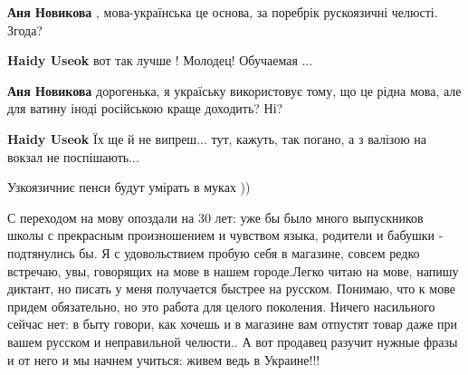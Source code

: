 \begin{itemize}
\begin{itemize}
\textbf{Аня Новикова} , мова-українська це основа, за поребрік рускоязичні челюсті. Згода?

 
\textbf{Haidy Useok} вот так лучше ! Молодец! Обучаемая ...

 
\textbf{Аня Новикова} дорогенька, я україську
використовує тому, що це рідна мова, але для ватину іноді російською краще доходить? Ні?

 
\textbf{Haidy Useok} Їх ще й не випреш... тут, кажуть, так погано, а з валізою на вокзал не поспішають...
\end{itemize}

 
Узкоязичниє пенси будут умірать в муках ))

 

С переходом на мову опоздали на 30 лет: уже бы было много выпускников школы с
прекрасным произношением и чувством языка, родители и бабушки - подтянулись бы.
Я с удовольствием пробую себя в магазине, совсем редко встречаю, увы, говорящих
на мове в нашем городе.Легко читаю на мове, напишу диктант, но писать у меня
получается быстрее на русском. Понимаю, что к мове придем обязательно, но это
работа для целого поколения. Ничего насильного сейчас нет: в быту говори, как
хочешь и в магазине вам отпустят товар даже при вашем русском и неправильной
челюсти.. А вот продавец разучит нужные фразы и от него и мы начнем учиться:
живем ведь в Украине!!!


\end{itemize}
